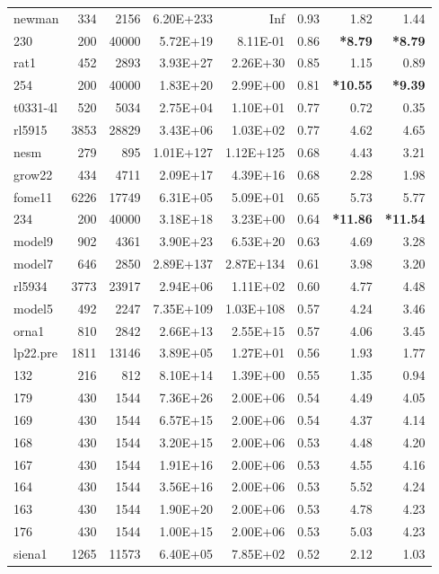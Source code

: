 \documentclass[10pt]{article}
\newcommand{\red}{
	\color{red}	
	}
\begin{document}
\begin{longtable}{|l|r|r|r|r|r|r|r|}
newman	&	334	&	2156	&	6.20E+233	&	Inf	&	0.93	&	1.82	&	1.44	\\
230	&	200	&	40000	&	5.72E+19	&	8.11E-01	&	0.86	&	{\bf \red *8.79}	&	{\bf \red *8.79}	\\
rat1	&	452	&	2893	&	3.93E+27	&	2.26E+30	&	0.85	&	1.15	&	0.89	\\
254	&	200	&	40000	&	1.83E+20	&	2.99E+00	&	0.81	&	{\bf \red *10.55}	&	{\bf \red *9.39} 	\\
t0331-4l	&	520	&	5034	&	2.75E+04	&	1.10E+01	&	0.77	&	0.72	&	0.35	\\
rl5915	&	3853	&	28829	&	3.43E+06	&	1.03E+02	&	0.77	&	4.62	&	4.65	\\
nesm	&	279	&	895	&	1.01E+127	&	1.12E+125	&	0.68	&	4.43	&	3.21	\\
grow22	&	434	&	4711	&	2.09E+17	&	4.39E+16	&	0.68	&	2.28	&	1.98	\\
fome11	&	6226	&	17749	&	6.31E+05	&	5.09E+01	&	0.65	&	5.73	&	5.77	\\
234	&	200	&	40000	&	3.18E+18	&	3.23E+00	&	0.64	&	{\bf \red *11.86}	&	{\bf \red *11.54} 	\\
model9	&	902	&	4361	&	3.90E+23	&	6.53E+20	&	0.63	&	4.69	&	3.28	\\
model7	&	646	&	2850	&	2.89E+137	&	2.87E+134	&	0.61	&	3.98	&	3.20	\\
rl5934	&	3773	&	23917	&	2.94E+06	&	1.11E+02	&	0.60	&	4.77	&	4.48	\\
model5	&	492	&	2247	&	7.35E+109	&	1.03E+108	&	0.57	&	4.24	&	3.46	\\
orna1	&	810	&	2842	&	2.66E+13	&	2.55E+15	&	0.57	&	4.06	&	3.45	\\
lp22.pre	&	1811	&	13146	&	3.89E+05	&	1.27E+01	&	0.56	&	1.93	&	1.77	\\
132	&	216	&	812	&	8.10E+14	&	1.39E+00	&	0.55	&	1.35	&	0.94	\\
179	&	430	&	1544	&	7.36E+26	&	2.00E+06	&	0.54	&	4.49	&	4.05	\\
169	&	430	&	1544	&	6.57E+15	&	2.00E+06	&	0.54	&	4.37	&	4.14	\\
168	&	430	&	1544	&	3.20E+15	&	2.00E+06	&	0.53	&	4.48	&	4.20	\\
167	&	430	&	1544	&	1.91E+16	&	2.00E+06	&	0.53	&	4.55	&	4.16	\\
164	&	430	&	1544	&	3.56E+16	&	2.00E+06	&	0.53	&	5.52	&	4.24	\\
163	&	430	&	1544	&	1.90E+20	&	2.00E+06	&	0.53	&	4.78	&	4.23	\\
176	&	430	&	1544	&	1.00E+15	&	2.00E+06	&	0.53	&	5.03	&	4.23	\\
siena1	&	1265	&	11573	&	6.40E+05	&	7.85E+02	&	0.52	&	2.12	&	1.03	\\

\end{longtable}
\end{document}
